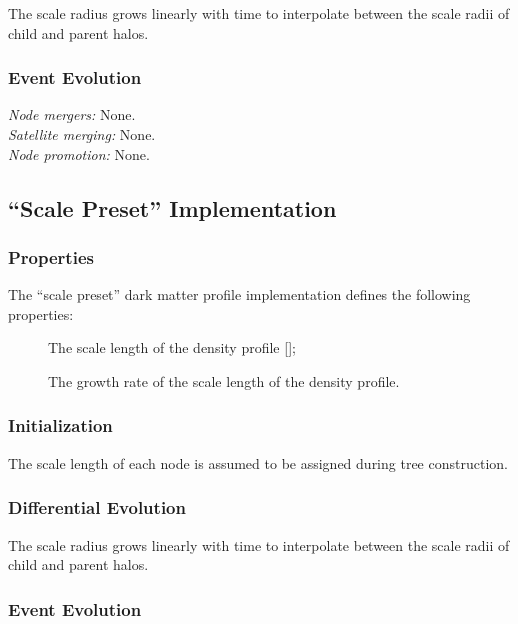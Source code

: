 The scale radius grows linearly with time to interpolate between the scale radii of child and parent halos.

\subsubsection{Event Evolution}

\noindent\emph{Node mergers:} None.\\

\noindent\emph{Satellite merging:} None.\\

\noindent\emph{Node promotion:} None.\\

\subsection{``Scale Preset'' Implementation}\label{sec:DarkMatterProfileScalePreset}

\subsubsection{Properties}

The ``scale preset'' dark matter profile implementation defines the following properties:
\begin{description}
 \item [] The scale length of the density profile [];
 \item [] The growth rate of the scale length of the density profile.
\end{description}

\subsubsection{Initialization}

The scale length of each node is assumed to be assigned during tree construction.

\subsubsection{Differential Evolution}

The scale radius grows linearly with time to interpolate between the scale radii of child and parent halos.

\subsubsection{Event Evolution}

